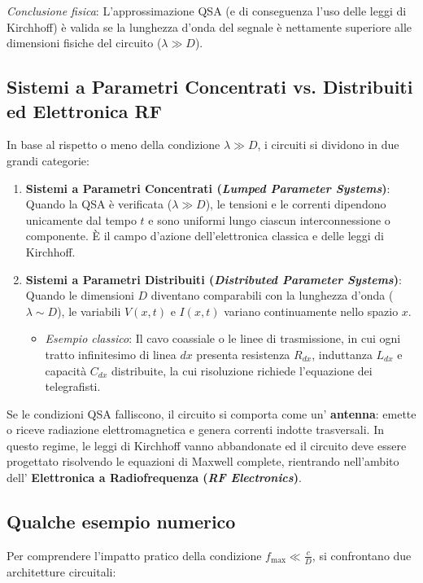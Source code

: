 \documentclass[12pt, a4paper]{report}
\begin{document}
\textit{Conclusione fisica}: L'approssimazione QSA (e di conseguenza l'uso delle leggi di Kirchhoff) è valida se la lunghezza d'onda del segnale è nettamente superiore alle dimensioni fisiche del circuito ($\lambda \gg D$).

\subsection{Sistemi a Parametri Concentrati vs. Distribuiti ed Elettronica RF}
In base al rispetto o meno della condizione $\lambda \gg D$, i circuiti si dividono in due grandi categorie:
\begin{enumerate}
    \item \textbf{Sistemi a Parametri Concentrati (\textit{Lumped Parameter Systems})}: Quando la QSA è verificata ($\lambda \gg D$), le tensioni e le correnti dipendono unicamente dal tempo $t$ e sono uniformi lungo ciascun interconnessione o componente. È il campo d'azione dell'elettronica classica e delle leggi di Kirchhoff.
    \item \textbf{Sistemi a Parametri Distribuiti (\textit{Distributed Parameter Systems})}: Quando le dimensioni $D$ diventano comparabili con la lunghezza d'onda ($\lambda \sim D$), le variabili $V(x,t)$ e $I(x,t)$ variano continuamente nello spazio $x$.
    \begin{itemize}
        \item \textit{Esempio classico}: Il cavo coassiale o le linee di trasmissione, in cui ogni tratto infinitesimo di linea $dx$ presenta resistenza $R_{dx}$, induttanza $L_{dx}$ e capacità $C_{dx}$ distribuite, la cui risoluzione richiede l'equazione dei telegrafisti.
    \end{itemize}
\end{enumerate}

Se le condizioni QSA falliscono, il circuito si comporta come un' \textbf{antenna}: emette o riceve radiazione elettromagnetica e genera correnti indotte trasversali. In questo regime, le leggi di Kirchhoff vanno abbandonate ed il circuito deve essere progettato risolvendo le equazioni di Maxwell complete, rientrando nell'ambito dell' \textbf{Elettronica a Radiofrequenza (\textit{RF Electronics})}.

\subsection{Qualche esempio numerico}
Per comprendere l'impatto pratico della condizione $f_{\text{max}} \ll \frac{c}{ D}$, si confrontano due architetture circuitali:
\end{document}

